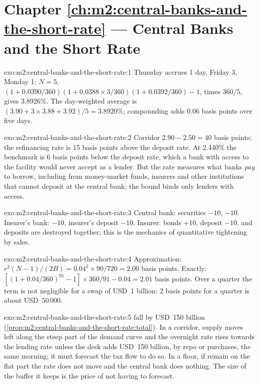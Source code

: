 \section*{Chapter \ref{ch:m2:central-banks-and-the-short-rate} --- Central Banks and the Short Rate}

\begin{solution}{exo:m2:central-banks-and-the-short-rate:1}
Thursday accrues 1 day, Friday 3, Monday 1: $N = 5$.
$(1 + 0.0390/360)(1 + 0.0388 \times 3/360)(1 + 0.0392/360) - 1$, times
$360/5$, gives 3.8926\%. The day-weighted average is $(3.90 + 3 \times 3.88 +
3.92)/5 = 3.8920\%$; compounding adds 0.06 basis points over five days.
\end{solution}

\begin{solution}{exo:m2:central-banks-and-the-short-rate:2}
Corridor $2.90 - 2.50 = 40$ basis points; the refinancing rate is 15 basis
points above the deposit rate. At 2.440\% the benchmark is 6 basis points
below the deposit rate, which a bank with access to the facility would never
accept as a lender. But the rate measures what banks \emph{pay} to borrow,
including from money-market funds, insurers and other institutions that
cannot deposit at the central bank; the bound binds only lenders with access.
\end{solution}

\begin{solution}{exo:m2:central-banks-and-the-short-rate:3}
Central bank: securities $-10$,  $-10$. Insurer's bank: 
$-10$, insurer's deposit $-10$. Insurer: bonds $+10$, deposit $-10$. 
and deposits are destroyed together; this is the mechanics of quantitative
tightening by sales.
\end{solution}

\begin{solution}{exo:m2:central-banks-and-the-short-rate:4}
Approximation: $r^2(N-1)/(2B) = 0.04^2 \times 90/720 = 2.00$ basis points.
Exactly: $[(1 + 0.04/360)^{91} - 1] \times 360/91 - 0.04 = 2.01$ basis points.
Over a quarter the term is not negligible for a swap of USD~1 billion: 2
basis points for a quarter is about USD~50\,000.
\end{solution}

\begin{solution}{exo:m2:central-banks-and-the-short-rate:5}
 fall by USD~150 billion
(\cref{prop:m2:central-banks-and-the-short-rate:total}). In a corridor,
supply moves left along the steep part of the demand curve and the overnight
rate rises towards the lending rate unless the desk adds USD~150 billion,
by repo or purchases, the same morning; it must forecast the tax flow to do
so. In a floor, if  remain on the flat part the rate does not move and
the central bank does nothing. The size of the buffer it keeps is the price of
not having to forecast.
\end{solution}

